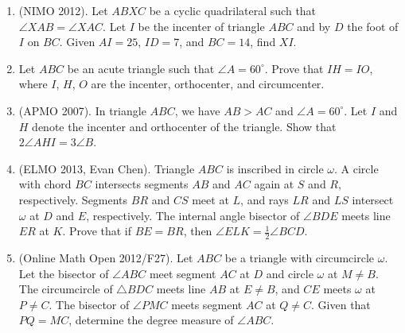 \documentclass[12pt]{scrartcl}
\begin{document}
\begin{enumerate}[resume]
\item (NIMO 2012). Let $ABXC$ be a cyclic quadrilateral such that $\angle XAB = \angle XAC$. Let $I$ be the incenter of triangle $ABC$ and by $D$ the foot of $I$ on $BC$. Given $AI = 25$, $ID = 7$, and $BC = 14$, find $XI$.

\item Let $ABC$ be an acute triangle such that $\angle A = 60^\circ$. Prove that $IH = IO$, where $I$, $H$, $O$ are the incenter, orthocenter, and circumcenter.

\item (APMO 2007). In triangle $ABC$, we have $AB > AC$ and $\angle A = 60^\circ$. Let $I$ and $H$ denote the incenter and orthocenter of the triangle. Show that $2\angle AHI = 3\angle B$.

\item (ELMO 2013, Evan Chen). Triangle $ABC$ is inscribed in circle $\omega$. A circle with chord $BC$ intersects segments $AB$ and $AC$ again at $S$ and $R$, respectively. Segments $BR$ and $CS$ meet at $L$, and rays $LR$ and $LS$ intersect $\omega$ at $D$ and $E$, respectively. The internal angle bisector of $\angle BDE$ meets line $ER$ at $K$. Prove that if $BE = BR$, then $\angle ELK = \frac{1}{2}\angle BCD$.

\item (Online Math Open 2012/F27). Let $ABC$ be a triangle with circumcircle $\omega$. Let the bisector of $\angle ABC$ meet segment $AC$ at $D$ and circle $\omega$ at $M \neq B$. The circumcircle of $\triangle BDC$ meets line $AB$ at $E \neq B$, and $CE$ meets $\omega$ at $P \neq C$. The bisector of $\angle PMC$ meets segment $AC$ at $Q \neq C$. Given that $PQ = MC$, determine the degree measure of $\angle ABC$.
\end{enumerate}
\end{document}
